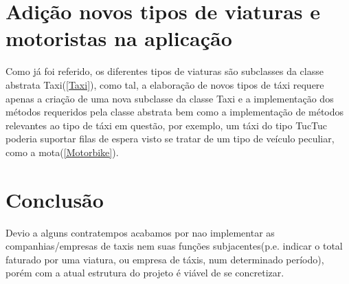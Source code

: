 \documentclass[a4paper,10pt,portuguese]{article}
\begin{document}
\section{Adição novos tipos de viaturas e motoristas na aplicação}
Como já foi referido, os diferentes tipos de viaturas são subclasses da classe abstrata Taxi(\ref{Taxi}), como tal, a elaboração de novos tipos de táxi requere apenas a criação de uma nova subclasse da classe Taxi e a implementação dos métodos requeridos pela classe abstrata bem como a implementação de métodos relevantes ao tipo de táxi em questão, por exemplo, um táxi do tipo TucTuc poderia suportar filas de espera visto se tratar de um tipo de veículo peculiar, como a mota(\ref{Motorbike}).
\newpage

\section{Conclusão}
Devio a alguns contratempos acabamos por nao implementar as companhias/empresas de taxis nem suas funções subjacentes(p.e. indicar o total faturado por uma viatura, ou empresa de táxis, num determinado período), porém com a atual estrutura do projeto é viável de se concretizar.
\end{document}
